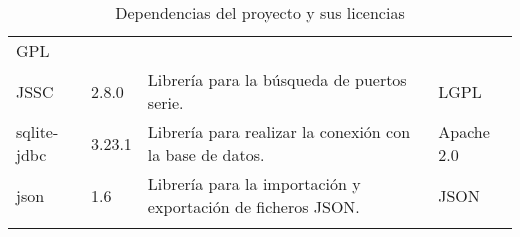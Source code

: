 \begin{longtable}[]{@{}llll@{}}
\begin{minipage}[t]{0.11\columnwidth}
GPL\strut
\end{minipage}\tabularnewline
\begin{minipage}[t]{0.18\columnwidth}\raggedright\strut
JSSC\strut
\end{minipage} & \begin{minipage}[t]{0.08\columnwidth}\raggedright\strut
2.8.0\strut
\end{minipage} & \begin{minipage}[t]{0.49\columnwidth}\raggedright\strut
Librería para la búsqueda de puertos serie.\strut
\end{minipage} & \begin{minipage}[t]{0.11\columnwidth}\raggedright\strut
LGPL\strut
\end{minipage}\tabularnewline
\begin{minipage}[t]{0.18\columnwidth}\raggedright\strut
sqlite-jdbc\strut
\end{minipage} & \begin{minipage}[t]{0.08\columnwidth}\raggedright\strut
3.23.1\strut
\end{minipage} & \begin{minipage}[t]{0.49\columnwidth}\raggedright\strut
Librería para realizar la conexión con la base de datos.\strut
\end{minipage} & \begin{minipage}[t]{0.11\columnwidth}\raggedright\strut
Apache 2.0\strut
\end{minipage}\tabularnewline
\begin{minipage}[t]{0.18\columnwidth}\raggedright\strut
json\strut
\end{minipage} & \begin{minipage}[t]{0.08\columnwidth}\raggedright\strut
1.6\strut
\end{minipage} & \begin{minipage}[t]{0.49\columnwidth}\raggedright\strut
Librería para la importación y exportación de ficheros JSON.\strut
\end{minipage} & \begin{minipage}[t]{0.11\columnwidth}\raggedright\strut
JSON\strut
\end{minipage}\tabularnewline
\bottomrule
\caption{Dependencias del proyecto y sus licencias}
\end{longtable}







